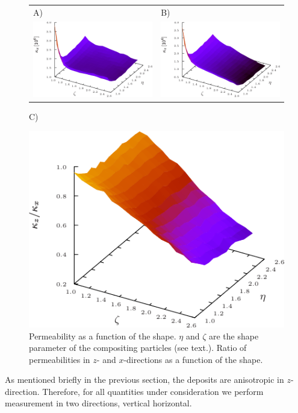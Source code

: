 \documentclass[aps,twocolumn,superscriptaddress,showpacs,showkeys]{revtex4-1}
\begin{document}
\begin{figure}
\begin{tabular}{l l}
A) & B) \\
\includegraphics*[width=0.48\columnwidth]{data-figs/permeability_x}
&
\includegraphics*[width=0.48\columnwidth]{data-figs/permeability_z} \\
\end{tabular}

\flushleft C) 

\includegraphics*[width=1.0\columnwidth]{data-figs/permeability_ratio}
\caption{
Permeability as a function of the shape. $\eta$ and $\zeta$ 
are the shape parameter of the compositing particles (see text.).
Ratio of permeabilities in $z$- and $x$-directions as a function of the shape.
\label{fig:perm}
}
\end{figure}
%
As mentioned briefly in the previous section, the deposits are anisotropic in
$z$-direction.  Therefore, for all quantities under consideration we perform
measurement in two directions, vertical horizontal.
\end{document}
